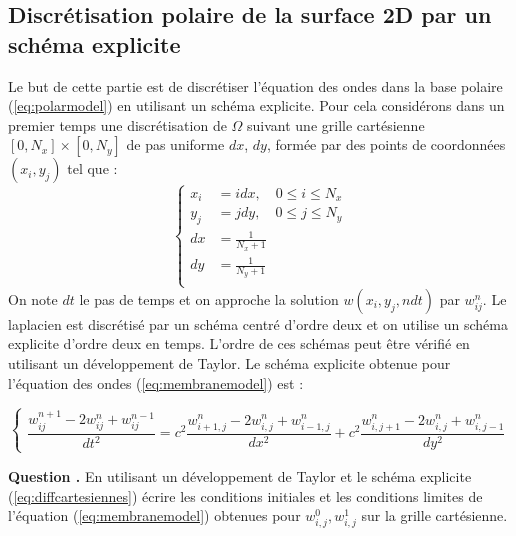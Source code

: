 \documentclass[a4,12pt]{article}
\newcounter{Nbquestion}
\newcommand*\question{%
\stepcounter{Nbquestion}%
\textbf{Question \theNbquestion. }}
\begin{document}
\subsection{Discrétisation polaire de la surface 2D par un schéma explicite }
Le but de cette partie est de discrétiser l'équation des ondes dans la base polaire (\ref{eq:polarmodel}) en utilisant un schéma explicite. Pour cela considérons dans un premier temps une discrétisation de $\Omega $ suivant une grille cartésienne $[0,N_x]\times [0,N_y]$ de pas uniforme $dx$, $dy$, formée par des points de coordonnées $(x_i,y_j)$ tel que :
\begin{equation*}{}
	\left\{
	\begin{array}{rl}
		x_i &=i dx,\quad 0\leq i \leq N_x \\
		y_j &=j dy,\quad  0\leq j \leq N_y \\
 		dx & =\frac{1}{N_x+1}\\
		 dy &=\frac{1}{N_y+1}\\
	\end{array}
	\right.
\end{equation*}
On note $dt$ le pas de temps et on approche la solution $w(x_i,y_j,ndt)$ par $w_{ij}^{n}$. Le laplacien est discrétisé  par un schéma centré d'ordre deux  et on utilise un schéma explicite d'ordre deux en temps. L'ordre de ces schémas peut être vérifié en utilisant un développement de Taylor. Le schéma explicite obtenue pour l'équation des ondes (\ref{eq:membranemodel}) est :

\begin{equation}
	\left\{
	\begin{array}{rl}
		\dfrac{w_{ij}^{n+1}-2w_{ij}^{n}+w_{ij}^{n-1}}{dt^{2}}=c^2\dfrac{w_{i+1,j}^{n}-2w_{i,j}^{n}+w_{i-1,j}^{n}}
		{dx^{2}}+c^2\dfrac{w_{i,j+1}^{n}-2w_{i,j}^{n}+w_{i,j-1}^{n}}{dy^{2}}
	\end{array}
	\right.
	\label{eq:diffcartesiennes}
\end{equation}


\begin{mdframed}[style=exampledefault]
\question En utilisant un développement de Taylor  et le  schéma explicite (\ref{eq:diffcartesiennes}) écrire les conditions initiales et les conditions limites de l'équation (\ref{eq:membranemodel}) obtenues pour $w_{i,j}^0,w_{i,j}^1$ sur la grille cartésienne.
\end{mdframed}

\end{document}
